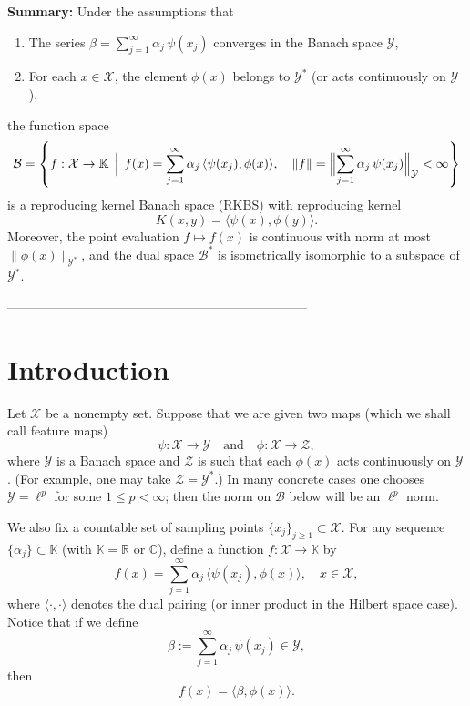 \bigskip

\noindent
\textbf{Summary:} Under the assumptions that
\begin{enumerate}
  \item The series $\beta = \sum_{j=1}^\infty \alpha_j\, \psi(x_j)$ converges in the Banach space $\mathcal{Y}$,
  \item For each $x\in\mathcal{X}$, the element $\phi(x)$ belongs to $\mathcal{Y}^*$ (or acts continuously on $\mathcal{Y}$),
\end{enumerate}
the function space
\[
\mathcal{B} = \left\{ f:\mathcal{X}\to \mathbb{K}\,\Bigm|\, f(x)= \sum_{j=1}^\infty \alpha_j\, \langle \psi(x_j), \phi(x)\rangle,\quad \|f\| = \Bigl\|\sum_{j=1}^\infty \alpha_j\, \psi(x_j)\Bigr\|_{\mathcal{Y}} < \infty \right\}
\]
is a reproducing kernel Banach space (RKBS) with reproducing kernel
\[
K(x,y)=\langle \psi(x), \phi(y)\rangle.
\]
Moreover, the point evaluation $f\mapsto f(x)$ is continuous with norm at most $\|\phi(x)\|_{\mathcal{Y}^*}$, and the dual space $\mathcal{B}^*$ is isometrically isomorphic to a subspace of $\mathcal{Y}^*$.

-----------------------------------------------------------------------\\

\section{Introduction}

Let \(\mathcal{X}\) be a nonempty set. Suppose that we are given two maps (which we shall call feature maps)
\[
\psi : \mathcal{X} \to \mathcal{Y} \quad \text{and} \quad \phi : \mathcal{X} \to \mathcal{Z},
\]
where \(\mathcal{Y}\) is a Banach space and \(\mathcal{Z}\) is such that each \(\phi(x)\) acts continuously on \(\mathcal{Y}\). (For example, one may take \(\mathcal{Z}=\mathcal{Y}^*\).) In many concrete cases one chooses \(\mathcal{Y} = \ell^p\) for some \(1\le p<\infty\); then the norm on \(\mathcal{B}\) below will be an \(\ell^p\) norm.

We also fix a countable set of sampling points \(\{x_j\}_{j\ge1}\subset \mathcal{X}\). For any sequence \(\{\alpha_j\}\subset \mathbb{K}\) (with \(\mathbb{K}=\mathbb{R}\) or \(\mathbb{C}\)), define a function \(f:\mathcal{X}\to \mathbb{K}\) by
\[
f(x)= \sum_{j=1}^\infty \alpha_j\, \langle \psi(x_j), \phi(x)\rangle, \quad x\in \mathcal{X},
\]
where \(\langle\cdot,\cdot\rangle\) denotes the dual pairing (or inner product in the Hilbert space case). Notice that if we define
\[
\beta := \sum_{j=1}^\infty \alpha_j\, \psi(x_j) \in \mathcal{Y},
\]
then
\[
f(x)= \langle \beta, \phi(x)\rangle.
\]

